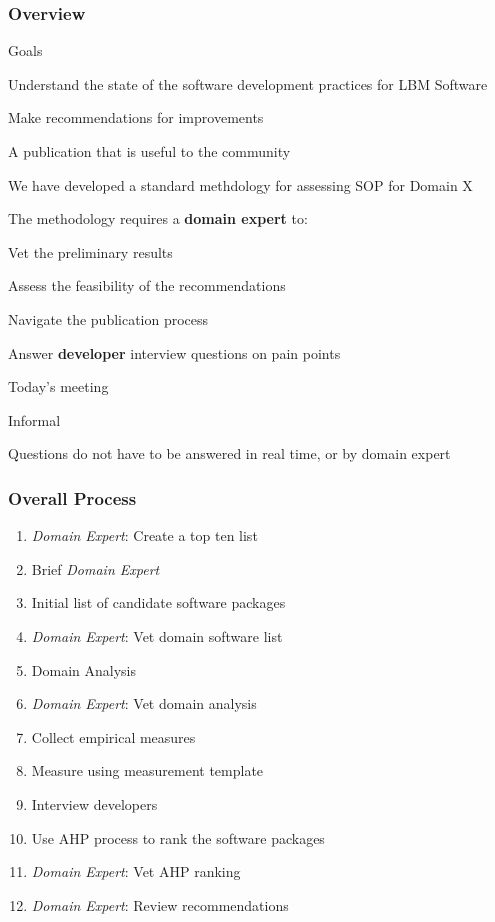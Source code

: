 \documentclass[t,12pt,numbers,fleqn]{beamer}
\begin{document}





\begin{frame}
\frametitle{Overview}

\bi
\item Goals
  \bi
  \item Understand the state of the software development practices for
    LBM Software
  \item Make recommendations for improvements
  \item A publication that is useful to the community
  \ei  
\item We have developed a standard methdology for assessing SOP for Domain X
\item The methodology requires a \textbf{domain expert} to:
  \bi
  \item Vet the preliminary results
  \item Assess the feasibility of the recommendations
  \item Navigate the publication process
  \item Answer \textbf{developer} interview questions on pain points  
  \ei
\item Today's meeting
  \bi
\item Informal
\item Questions do not have to be answered in real time, or by domain expert
  \ei
\ei

\end{frame}


\begin{frame}
\frametitle{Overall Process}

\begin{enumerate}
\item \emph{Domain Expert}: Create a top ten list
\item Brief \emph{Domain Expert}
\item Initial list of candidate software packages
\item \emph{Domain Expert}: Vet domain software list
\item Domain Analysis
\item \emph{Domain Expert}: Vet domain analysis
\item Collect empirical measures
\item Measure using measurement template
\item Interview developers
\item Use AHP process to rank the software packages
\item \emph{Domain Expert}: Vet AHP ranking
\item \emph{Domain Expert}: Review recommendations
\end{enumerate}

\end{frame}
\end{document}
